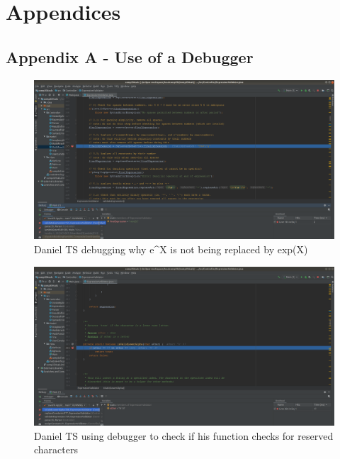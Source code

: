 \documentclass[a4paper, 12pt]{article}
\begin{document}
\pagebreak

\section{Appendices}

\subsection{Appendix A - Use of a Debugger}

\begin{figure}[H]
\centering
\includegraphics[width=1.13\textwidth]{dan1.png}
\caption{Daniel TS debugging why e\textasciicircum X is not being replaced by exp(X)}
\label{Dan1}
\end{figure}

\vspace{20mm}


\begin{figure}[H]
\centering
\includegraphics[width=1.13\textwidth]{dan2.png}
\caption{Daniel TS using debugger to check if his function checks for reserved characters}
\label{Dan2}
\end{figure}
\end{document}
